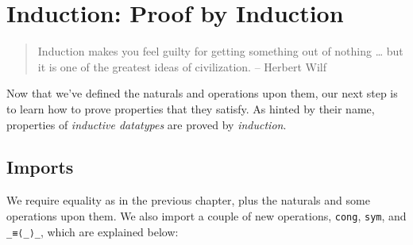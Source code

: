 \hypertarget{Induction}{%
\chapter{Induction: Proof by Induction}\label{Induction}}

\begin{fence}
\begin{code}%
\>[0]\AgdaSpace{}%
\AgdaSpace{}%
\<%
\end{code}
\end{fence}

\begin{quote}
Induction makes you feel guilty for getting something out of nothing
\ldots{} but it is one of the greatest ideas of civilization. -- Herbert
Wilf
\end{quote}

Now that we've defined the naturals and operations upon them, our next
step is to learn how to prove properties that they satisfy. As hinted by
their name, properties of \emph{inductive datatypes} are proved by
\emph{induction}.

\hypertarget{imports}{%
\section{Imports}\label{imports}}

We require equality as in the previous chapter, plus the naturals and
some operations upon them. We also import a couple of new operations,
\texttt{cong}, \texttt{sym}, and \texttt{\_≡⟨\_⟩\_}, which are explained
below:

